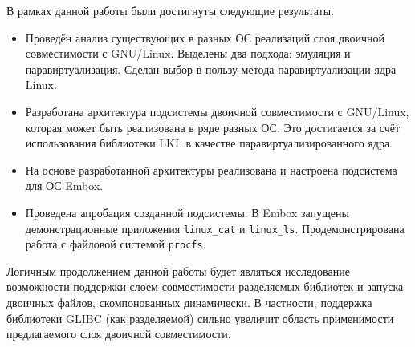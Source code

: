 
В рамках данной работы были достигнуты следующие результаты.
\begin{itemize}
  \item Проведён анализ существующих в разных ОС реализаций слоя двоичной совместимости с GNU/Linux. Выделены два подхода: эмуляция и паравиртуализация. Сделан выбор в пользу метода паравиртуализации ядра Linux.
  \item Разработана архитектура подсистемы двоичной совместимости с GNU/Linux, которая может быть реализована в ряде разных ОС. Это достигается за счёт использования библиотеки LKL в качестве паравиртуализированного ядра.
  \item На основе разработанной архитектуры реализована и настроена подсистема для ОС Embox.
  \item Проведена апробация созданной подсистемы. В Embox запущены демонстрационные приложения \texttt{linux\_cat} и \texttt{linux\_ls}. Продемонстрирована работа с файловой системой \texttt{procfs}.
\end{itemize}

Логичным продолжением данной работы будет являться исследование возможности поддержки слоем совместимости разделяемых библиотек и запуска двоичных файлов, скомпонованных динамически. В частности, поддержка библиотеки GLIBC (как разделяемой) сильно увеличит область применимости предлагаемого слоя двоичной совместимости.
